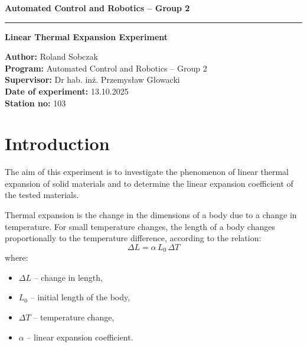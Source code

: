 \documentclass[a4paper,12pt]{article}
\begin{document}

\noindent\textbf{Automated Control and Robotics – Group 2}\\[-0.2em]
\rule{\textwidth}{0.4pt}
\vspace{1cm}

\begin{center}
{\Huge \textbf{Linear Thermal Expansion Experiment}}\\[1.5cm]
\end{center}

\begin{flushleft}
\textbf{Author:} Roland Sobczak\\[0.3em]
\textbf{Program:} Automated Control and Robotics – Group 2\\[0.3em]
\textbf{Supervisor:} Dr hab. inż. Przemysław Głowacki\\[0.3em]
\textbf{Date of experiment:} 13.10.2025\\[0.3em]
\textbf{Station no:} 103 
\end{flushleft}


\section{Introduction}

The aim of this experiment is to investigate the phenomenon of linear thermal expansion of solid materials and to determine the linear expansion coefficient of the tested materials.

Thermal expansion is the change in the dimensions of a body due to a change in temperature. For small temperature changes, the length of a body changes proportionally to the temperature difference, according to the relation:
\begin{equation}
    \Delta L = \alpha \, L_0 \, \Delta T
\end{equation}
where:
\begin{itemize}
    \item $\Delta L$ – change in length,
    \item $L_0$ – initial length of the body,
    \item $\Delta T$ – temperature change,
    \item $\alpha$ – linear expansion coefficient.
\end{itemize}
\end{document}
